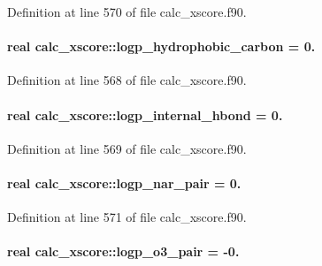 Definition at line 570 of file calc\-\_\-xscore.\-f90.

\hypertarget{classcalc__xscore_ab14312bf5c3dcc3c886028169b03996a}{
\paragraph[{logp\-\_\-hydrophobic\-\_\-carbon}]{\setlength{\rightskip}{0pt plus 5cm}real calc\-\_\-xscore\-::logp\-\_\-hydrophobic\-\_\-carbon = 0.}}\label{classcalc__xscore_ab14312bf5c3dcc3c886028169b03996a}


Definition at line 568 of file calc\-\_\-xscore.\-f90.

\hypertarget{classcalc__xscore_abc42931dda7edcd8c88ac86abada0582}{
\paragraph[{logp\-\_\-internal\-\_\-hbond}]{\setlength{\rightskip}{0pt plus 5cm}real calc\-\_\-xscore\-::logp\-\_\-internal\-\_\-hbond = 0.}}\label{classcalc__xscore_abc42931dda7edcd8c88ac86abada0582}


Definition at line 569 of file calc\-\_\-xscore.\-f90.

\hypertarget{classcalc__xscore_ac41000d70d0714d19503acad4d5e5d07}{
\paragraph[{logp\-\_\-nar\-\_\-pair}]{\setlength{\rightskip}{0pt plus 5cm}real calc\-\_\-xscore\-::logp\-\_\-nar\-\_\-pair = 0.}}\label{classcalc__xscore_ac41000d70d0714d19503acad4d5e5d07}


Definition at line 571 of file calc\-\_\-xscore.\-f90.

\hypertarget{classcalc__xscore_acdd9fd310f985b85ce23c3a6fcfcf1dd}{
\paragraph[{logp\-\_\-o3\-\_\-pair}]{\setlength{\rightskip}{0pt plus 5cm}real calc\-\_\-xscore\-::logp\-\_\-o3\-\_\-pair = -\/0.}}\label{classcalc__xscore_acdd9fd310f985b85ce23c3a6fcfcf1dd}


